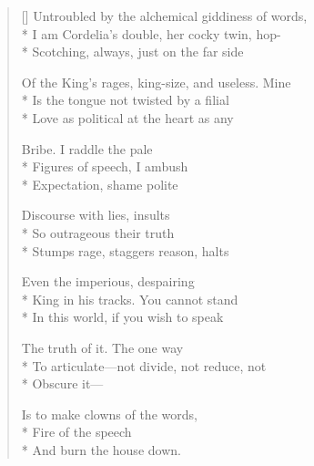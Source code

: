 \label{ch:lear_aj}
\begin{verse}[\versewidth]
Untroubled by the alchemical giddiness of words,\\*
I am Cordelia's double, her cocky twin, hop-\\*
Scotching, always, just on the far side

Of the King's rages, king-size, and useless.   Mine\\*
Is the tongue not twisted by a filial\\*
Love as political at the heart as any

Bribe.     I raddle the pale\\*
Figures of speech, I ambush\\*
Expectation, shame polite

Discourse with lies, insults\\*
So outrageous their truth\\*
Stumps rage, staggers reason, halts

Even the imperious, despairing\\*
King in his tracks.\hspace*{3\vgap} You cannot stand\\*
In this world, if you wish to speak

The truth of it.  The one way\\*
To articulate---not divide, not reduce, not\\*
Obscure it---

\hspace*{3\vgap} Is to make clowns of the words,\\*
Fire of the speech\\*
And burn the house down.
\end{verse}
